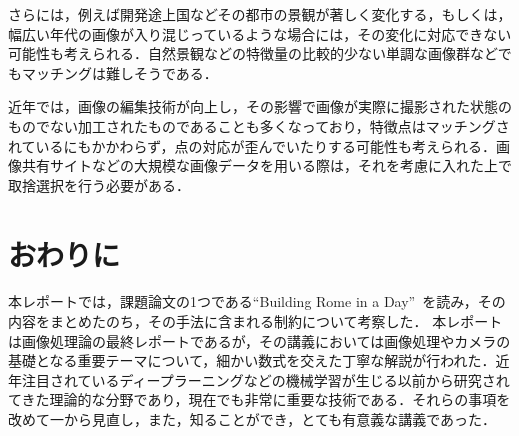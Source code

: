 \documentclass[onecolumn]{preport}
\begin{document}
さらには，例えば開発途上国などその都市の景観が著しく変化する，もしくは，幅広い年代の画像が入り混じっているような場合には，その変化に対応できない可能性も考えられる．自然景観などの特徴量の比較的少ない単調な画像群などでもマッチングは難しそうである．

近年では，画像の編集技術が向上し，その影響で画像が実際に撮影された状態のものでない加工されたものであることも多くなっており，特徴点はマッチングされているにもかかわらず，点の対応が歪んでいたりする可能性も考えられる．画像共有サイトなどの大規模な画像データを用いる際は，それを考慮に入れた上で取捨選択を行う必要がある．

\section{おわりに}

本レポートでは，課題論文の1つである``Building Rome in a Day''~\cite{Rome}を読み，その内容をまとめたのち，その手法に含まれる制約について考察した．
本レポートは画像処理論の最終レポートであるが，その講義においては画像処理やカメラの基礎となる重要テーマについて，細かい数式を交えた丁寧な解説が行われた．近年注目されているディープラーニングなどの機械学習が生じる以前から研究されてきた理論的な分野であり，現在でも非常に重要な技術である．それらの事項を改めて一から見直し，また，知ることができ，とても有意義な講義であった．

\large


\end{document}
